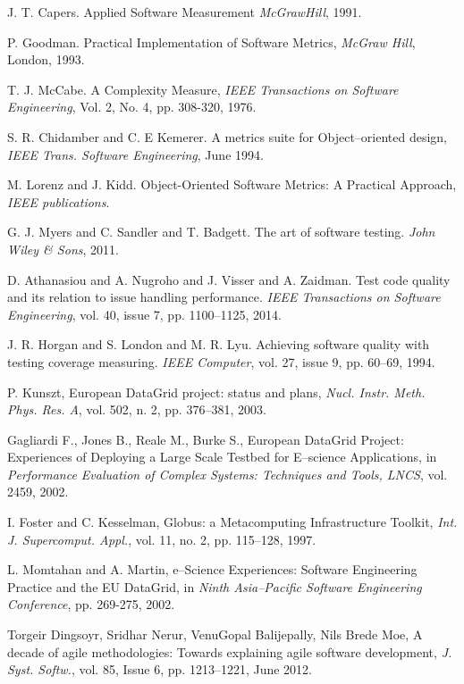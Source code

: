 \documentclass[journal]{IEEEtran}
\begin{document}
\begin{thebibliography}{1}
J. T. Capers.
Applied Software Measurement
\emph{McGrawHill}, 1991. 

P. Goodman.
Practical Implementation of Software Metrics, 
\emph{McGraw Hill}, London, 1993.


T. J. McCabe.
A   Complexity   Measure,
\emph{IEEE   Transactions   on   Software Engineering},
Vol. 2, No. 4, pp. 308-320, 1976.

S.  R.  Chidamber  and  C.  E  Kemerer.
A  metrics  suite  for  Object--oriented  design,
\emph{IEEE Trans. Software Engineering}, 
June 1994.

M. Lorenz and J. Kidd.
Object-Oriented Software Metrics: A Practical Approach,
\emph{IEEE publications}.

G. J. Myers and C. Sandler and T. Badgett.
The art of software testing.
\emph{John Wiley \& Sons}, 2011.



D. Athanasiou and A. Nugroho and J. Visser and A. Zaidman.
Test code quality and its relation to issue handling performance.
\emph{IEEE Transactions on Software Engineering}, 
vol. 40, issue 7, pp. 1100--1125, 2014.



J. R. Horgan and S. London and M. R. Lyu.
Achieving software quality with testing coverage measuring.
\emph{IEEE Computer},
vol. 27, issue 9, pp. 60--69, 1994.



P. Kunszt,
European DataGrid project: status and plans,
\emph{Nucl. Instr. Meth. Phys. Res. A},
vol. 502, n. 2, pp. 376--381, 2003.

Gagliardi F., Jones B., Reale M., Burke S.,
European DataGrid Project: Experiences of Deploying a Large Scale Testbed for E--science Applications,
in \emph{Performance Evaluation of Complex Systems: Techniques and Tools, LNCS},
vol. 2459, 2002.

I. Foster and C. Kesselman,
Globus: a Metacomputing Infrastructure Toolkit,
\emph{Int. J. Supercomput. Appl.},
vol. 11, no. 2, pp. 115--128, 1997.

L. Momtahan and A. Martin,
e--Science Experiences: Software Engineering Practice and the EU DataGrid,
in \emph{Ninth Asia--Pacific Software Engineering Conference},
pp. 269-275, 2002.

Torgeir Dingsoyr, Sridhar Nerur, VenuGopal Balijepally, Nils Brede Moe,
A decade of agile methodologies: Towards explaining agile software development,
\emph{J. Syst. Softw.},
vol. 85, Issue 6, pp. 1213--1221, June 2012.


\end{thebibliography}
\end{document}
